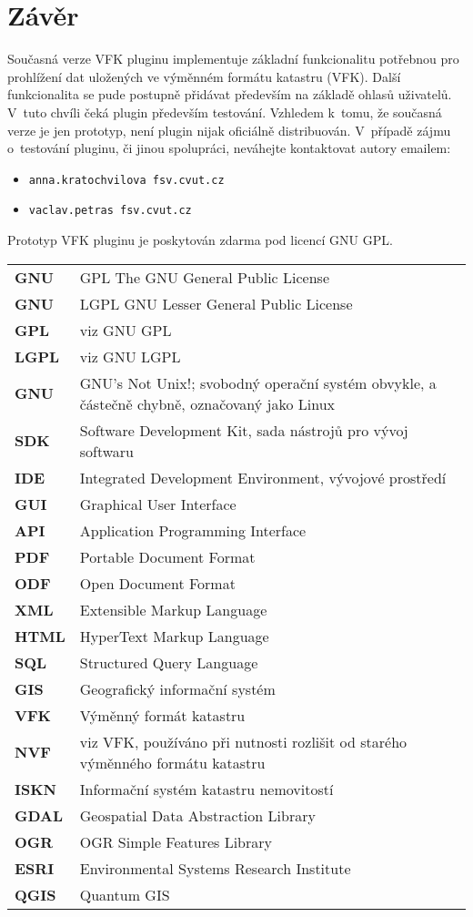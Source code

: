 \documentclass[a4paper,10pt]{article}
\newcommand{\radekZkr}[2]{\textbf{#1} & #2 \\}
\begin{document}
\section{Závěr}
Současná verze VFK pluginu implementuje základní funkcionalitu potřebnou pro prohlížení dat uložených ve výměnném formátu katastru (VFK).
Další funkcionalita se pude postupně přidávat především na základě ohlasů uživatelů.
V~tuto chvíli čeká plugin především testování.
Vzhledem k~tomu, že současná verze je jen prototyp, není plugin nijak oficiálně distribuován.
V~případě zájmu o~testování pluginu, či jinou spolupráci, neváhejte kontaktovat autory emailem:
    \begin{itemize}
    \item \verb|anna.kratochvilova fsv.cvut.cz|
    \item \verb|vaclav.petras fsv.cvut.cz|
    \end{itemize}
    
Prototyp VFK pluginu je poskytován zdarma pod licencí GNU GPL.

\newpage
\begin{tabular}{lp{10cm}}

\radekZkr{GNU}{GPL The GNU General Public License}
\radekZkr{GNU}{LGPL GNU Lesser General Public License}
\radekZkr{GPL}{viz GNU GPL}
\radekZkr{LGPL}{viz GNU LGPL}
\radekZkr{GNU}{GNU's Not Unix!; svobodný operační systém obvykle, a částečně chybně, označovaný jako Linux}

\radekZkr{SDK}{Software Development Kit, sada nástrojů pro vývoj softwaru}
\radekZkr{IDE}{Integrated Development Environment, vývojové prostředí}
\radekZkr{GUI}{Graphical User Interface}
\radekZkr{API}{Application Programming Interface}

\radekZkr{PDF}{Portable Document Format}
\radekZkr{ODF}{Open Document Format}
\radekZkr{XML}{Extensible Markup Language}
\radekZkr{HTML}{HyperText Markup Language}
\radekZkr{SQL}{Structured Query Language}

\radekZkr{GIS}{Geografický informační systém}

\radekZkr{VFK}{Výměnný formát katastru}
\radekZkr{NVF}{viz VFK, používáno při nutnosti rozlišit od starého výměnného formátu katastru}
\radekZkr{ISKN}{Informační systém katastru nemovitostí}

\radekZkr{GDAL}{Geospatial Data Abstraction Library}
\radekZkr{OGR}{OGR Simple Features Library}
\radekZkr{ESRI}{Environmental Systems Research Institute}
\radekZkr{QGIS}{Quantum GIS}

\end{tabular}
\end{document}
